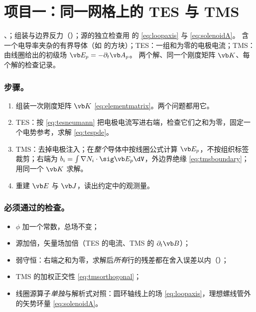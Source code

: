 \section{项目一：同一网格上的 TES 与 TMS}\label{sec:projects-p1}

{、；组装与边界反力（）；源的独立检查用 的 \eqref{eq:loopaxis} 与 \eqref{eq:solenoidA}。}
{含一个电导率夹杂的有界导体（如 的方块）；TES：一组和为零的电极电流；TMS：由线圈给出的初级场 $\vb E_p=-\partial_t\vb A_p$。}
{两个解、同一个刚度矩阵 $\vb K$、每个解的检查记录。}

\subsubsection{步骤。}
\begin{enumerate}
\item 组装一次刚度矩阵 $\vb K$ \eqref{eq:elementmatrix}。两个问题都用它。
\item TES：按 \eqref{eq:tesneumann} 把电极电流写进右端，检查它们之和为零，固定一个电势参考，求解 \eqref{eq:tespde}。
\item TMS：去掉电极注入；在\emph{整个}导体中按线圈公式计算 $\vb E_p$，不按组织标签裁剪；右端为 $b_i=\int\nabla N_i\cdot\sig\vb E_p\dV$，外边界绝缘 \eqref{eq:tmsboundary}；用同一个 $\vb K$ 求解。
\item 重建 $\vb E$ 与 $\vb J$，读出约定中的观测量。
\end{enumerate}

\subsubsection{必须通过的检查。}
\begin{itemize}[label=$\mdlgwhtsquare$]
\item $\phi$ 加一个常数，总场不变；
\item 源加倍，矢量场加倍（TES 的电流、TMS 的 $\partial_t\vb B$）；
\item 弱守恒：右端之和为零，求解后\emph{所有}行的残差都在舍入误差以内（）；
\item TMS 的加权正交性 \eqref{eq:tmsorthogonal}；
\item 线圈源算子\emph{单独}与解析式对照：圆环轴线上的场 \eqref{eq:loopaxis}，理想螺线管外的矢势环量 \eqref{eq:solenoidA}。
\end{itemize}

